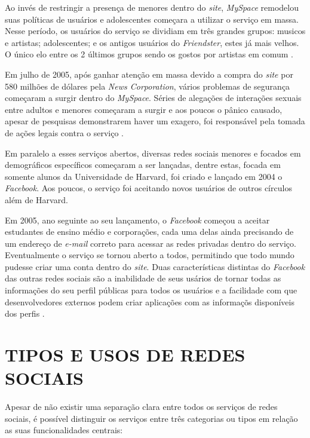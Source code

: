 Ao invés de restringir a presença de menores dentro do \textit{site}, \textit{MySpace} remodelou suas políticas de usuários e adolescentes começara a utilizar o serviço em massa. Nesse período, os usuários do serviço se dividiam em três grandes grupos: musicos e artistas; adolescentes; e os antigos usuários do \textit{Friendster}, estes já mais velhos. O único elo entre os 2 últimos grupos sendo os gostos por artistas em comum .

Em julho de 2005, após ganhar atenção em massa devido a compra do \textit{site} por 580 milhões de dólares pela \textit{News Corporation}, vários problemas de segurança começaram a surgir dentro do \textit{MySpace}. %
Séries de alegações de interações sexuais entre adultos e menores começaram a surgir e aos poucos o pânico causado, apesar de pesquisas demonstrarem haver um exagero, foi responsável pela tomada de ações legais contra o serviço .

Em paralelo a esses serviços abertos, diversas redes sociais menores e focados em demográficos específicos começaram a ser lançadas, dentre estas, focada em somente alunos da Universidade de Harvard, foi criado e lançado em 2004 o \textit{Facebook}. Aos poucos, o serviço foi aceitando novos usuários de outros círculos além de Harvard.

Em 2005, ano seguinte ao seu lançamento, o \textit{Facebook} começou a aceitar estudantes de ensino médio e corporações, cada uma delas ainda precisando de um endereço de \textit{e-mail} correto para acessar as redes privadas dentro do serviço. Eventualmente o serviço se tornou aberto a todos, permitindo que todo mundo pudesse criar uma conta dentro do \textit{site}. Duas características distintas do \textit{Facebook} das outras redes sociais são a inabilidade de seus usários de tornar todas as informações do seu perfil públicas para todos os usuários e a facilidade com que desenvolvedores externos podem criar aplicações com as informaçõs disponíveis dos perfis .

\section{TIPOS E USOS DE REDES SOCIAIS}
\label{sec:tiposRedesSociais}

Apesar de não existir uma separação clara entre todos os serviços de redes sociais, é possível distinguir os serviços entre três categorias ou tipos em relação as suas funcionalidades centrais:

